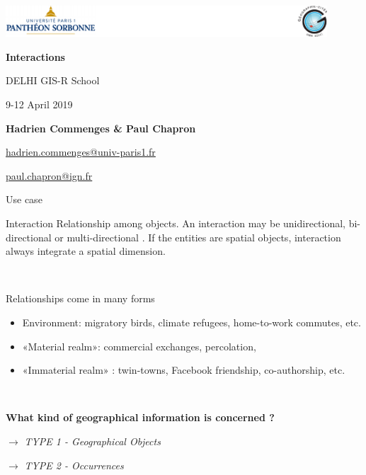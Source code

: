 \graphicspath{{IMAGE/}}

\begin{frame}

\includegraphics[width=12cm]{Logos.pdf}

\vfill

\begin{center}

\vspace*{1.5cm}

\LARGE
\textbf{Interactions}

\vspace*{1.5cm}
 DELHI GIS-R School


\large
9-12 April 2019

\vspace*{1.5cm}


\textbf{Hadrien Commenges \& Paul Chapron}

{\small

\vspace*{0.1cm}

\url{hadrien.commenges@univ-paris1.fr}

\url{paul.chapron@ign.fr}
}

\end{center}

\end{frame}



\begin{frame}{Use case}

\begin{block}{Interaction}
Relationship among objects.  An interaction may be unidirectional, bi-directional or multi-directional . 
If the entities are spatial objects, interaction always integrate a spatial dimension.
\end{block}

~

Relationships come in many forms

\begin{itemize}
\item Environment: migratory birds, climate refugees, home-to-work commutes, etc.
\item «Material realm»: commercial exchanges, percolation,   
\item «Immaterial realm» : twin-towns, Facebook friendship, co-authorship, etc.
\end{itemize}


~

\textbf{What kind of geographical information is concerned ?}



$\rightarrow$ \textit{TYPE 1 - Geographical Objects}

$\rightarrow$ \textit{TYPE 2 - Occurrences}



\end{frame}



